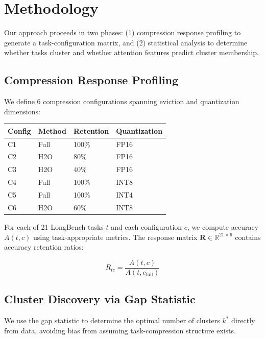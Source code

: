\section{Methodology}

Our approach proceeds in two phases: (1) compression response profiling to generate a task-configuration matrix, and (2) statistical analysis to determine whether tasks cluster and whether attention features predict cluster membership.

\subsection{Compression Response Profiling}

We define 6 compression configurations spanning eviction and quantization dimensions:

\begin{table}[h]
\centering
\begin{tabular}{@{}llll@{}}
\toprule
Config & Method & Retention & Quantization \\
\midrule
C1 & Full & 100\% & FP16 \\
C2 & H2O & 80\% & FP16 \\
C3 & H2O & 40\% & FP16 \\
C4 & Full & 100\% & INT8 \\
C5 & Full & 100\% & INT4 \\
C6 & H2O & 60\% & INT8 \\
\bottomrule
\end{tabular}
\end{table}

For each of 21 LongBench tasks $t$ and each configuration $c$, we compute accuracy $A(t, c)$ using task-appropriate metrics. The response matrix $\mathbf{R} \in \mathbb{R}^{21 \times 6}$ contains accuracy retention ratios:

\begin{equation}
R_{tc} = \frac{A(t, c)}{A(t, c_{\text{full}})}
\end{equation}

\subsection{Cluster Discovery via Gap Statistic}

We use the gap statistic \citep{tibshirani2001gap} to determine the optimal number of clusters $k^*$ directly from data, avoiding bias from assuming task-compression structure exists.

